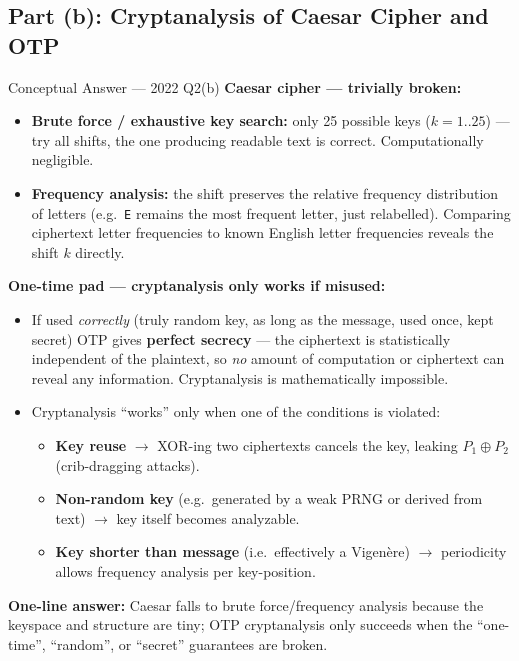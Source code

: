 \documentclass[12pt,a4paper]{article}
\begin{document}
\subsection{Part (b): Cryptanalysis of Caesar Cipher and OTP}
\begin{solbox}{Conceptual Answer --- 2022 Q2(b)}
\textbf{Caesar cipher --- trivially broken:}
\begin{itemize}[noitemsep]
  \item \textbf{Brute force / exhaustive key search:} only 25 possible keys ($k=1..25$) --- try all shifts, the one producing readable text is correct. Computationally negligible.
  \item \textbf{Frequency analysis:} the shift preserves the relative frequency distribution of letters (e.g.\ \texttt{E} remains the most frequent letter, just relabelled). Comparing ciphertext letter frequencies to known English letter frequencies reveals the shift $k$ directly.
\end{itemize}

\textbf{One-time pad --- cryptanalysis only works if misused:}
\begin{itemize}[noitemsep]
  \item If used \emph{correctly} (truly random key, as long as the message, used once, kept secret) OTP gives \textbf{perfect secrecy} --- the ciphertext is statistically independent of the plaintext, so \emph{no} amount of computation or ciphertext can reveal any information. Cryptanalysis is mathematically impossible.
  \item Cryptanalysis ``works'' only when one of the conditions is violated:
  \begin{itemize}[noitemsep]
    \item \textbf{Key reuse} $\to$ XOR-ing two ciphertexts cancels the key, leaking $P_1 \oplus P_2$ (crib-dragging attacks).
    \item \textbf{Non-random key} (e.g.\ generated by a weak PRNG or derived from text) $\to$ key itself becomes analyzable.
    \item \textbf{Key shorter than message} (i.e.\ effectively a Vigen\`ere) $\to$ periodicity allows frequency analysis per key-position.
  \end{itemize}
\end{itemize}

\textbf{One-line answer:} Caesar falls to brute force/frequency analysis because the keyspace and structure are tiny; OTP cryptanalysis only succeeds when the ``one-time'', ``random'', or ``secret'' guarantees are broken.
\end{solbox}
\end{document}
